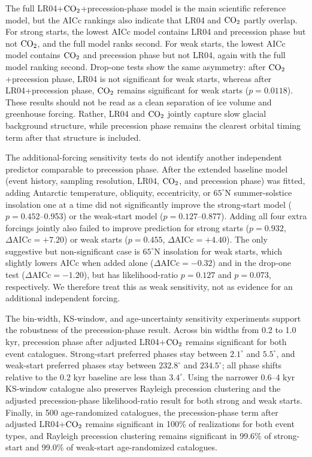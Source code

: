 \documentclass[11pt]{article}
\begin{document}
The full LR04+\(\ce{CO2}\)+precession-phase model is the main scientific reference model, but the AICc rankings also indicate that LR04 and \(\ce{CO2}\) partly overlap. For strong starts, the lowest AICc model contains LR04 and precession phase but not \(\ce{CO2}\), and the full model ranks second. For weak starts, the lowest AICc model contains \(\ce{CO2}\) and precession phase but not LR04, again with the full model ranking second. Drop-one tests show the same asymmetry: after \(\ce{CO2}\)+precession phase, LR04 is not significant for weak starts, whereas after LR04+precession phase, \(\ce{CO2}\) remains significant for weak starts (\(p=0.0118\)). These results should not be read as a clean separation of ice volume and greenhouse forcing. Rather, LR04 and \(\ce{CO2}\) jointly capture slow glacial background structure, while precession phase remains the clearest orbital timing term after that structure is included.

The additional-forcing sensitivity tests do not identify another independent predictor comparable to precession phase. After the extended baseline model (event history, sampling resolution, LR04, \(\ce{CO2}\), and precession phase) was fitted, adding Antarctic temperature, obliquity, eccentricity, or \(65^\circ\)N summer-solstice insolation one at a time did not significantly improve the strong-start model (\(p=0.452\)--0.953) or the weak-start model (\(p=0.127\)--0.877). Adding all four extra forcings jointly also failed to improve prediction for strong starts (\(p=0.932\), \(\Delta\mathrm{AICc}=+7.20\)) or weak starts (\(p=0.455\), \(\Delta\mathrm{AICc}=+4.40\)). The only suggestive but non-significant case is \(65^\circ\)N insolation for weak starts, which slightly lowers AICc when added alone (\(\Delta\mathrm{AICc}=-0.32\)) and in the drop-one test (\(\Delta\mathrm{AICc}=-1.20\)), but has likelihood-ratio \(p=0.127\) and \(p=0.073\), respectively. We therefore treat this as weak sensitivity, not as evidence for an additional independent forcing.

The bin-width, KS-window, and age-uncertainty sensitivity experiments support the robustness of the precession-phase result. Across bin widths from 0.2 to 1.0 kyr, precession phase after adjusted LR04+\(\ce{CO2}\) remains significant for both event catalogues. Strong-start preferred phases stay between \(2.1^\circ\) and \(5.5^\circ\), and weak-start preferred phases stay between \(232.8^\circ\) and \(234.5^\circ\); all phase shifts relative to the 0.2 kyr baseline are less than \(3.4^\circ\). Using the narrower 0.6--4 kyr KS-window catalogue also preserves Rayleigh precession clustering and the adjusted precession-phase likelihood-ratio result for both strong and weak starts. Finally, in 500 age-randomized catalogues, the precession-phase term after adjusted LR04+\(\ce{CO2}\) remains significant in 100\% of realizations for both event types, and Rayleigh precession clustering remains significant in 99.6\% of strong-start and 99.0\% of weak-start age-randomized catalogues.
\end{document}
